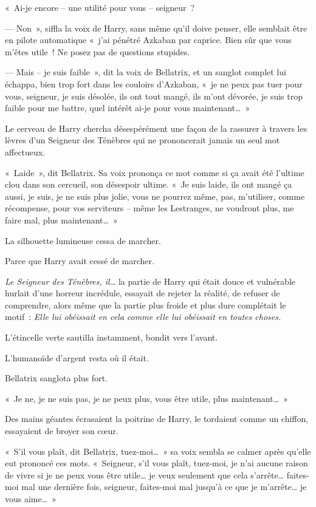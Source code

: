 «~Ai-je encore -- une utilité pour vous -- seigneur~?

--- Non~», siffla la voix de Harry, sans même qu'il doive penser, elle semblait être en pilote automatique «~j'ai pénétré Azkaban par caprice.
Bien sûr que vous m'êtes utile~!
Ne posez pas de questions stupides.

--- Mais -- je suis faible~», dit la voix de Bellatrix, et un sanglot complet lui échappa, bien trop fort dans les couloirs d'Azkaban, «~je ne peux pas tuer pour vous, seigneur, je suis désolée, ils ont tout mangé, ils m'ont dévorée, je suis trop faible pour me battre, quel intérêt ai-je pour vous maintenant…~»

Le cerveau de Harry chercha désespérément une façon de la rassurer à travers les lèvres d'un Seigneur des Ténèbres qui ne prononcerait jamais un seul mot affectueux.

«~Laide~», dit Bellatrix.
Sa voix prononça ce mot comme si ça avait été l'ultime clou dans son cercueil, son désespoir ultime.
«~Je suis laide, ils ont mangé ça aussi, je suis, je ne suis plus jolie, vous ne pourrez même, pas, m'utiliser, comme récompense, pour vos serviteurs -- même les Lestranges, ne voudront plus, me faire mal, plus maintenant…~»

La silhouette lumineuse cessa de marcher.

Parce que Harry avait cessé de marcher.

\emph{Le Seigneur des Ténèbres, il…} la partie de Harry qui était douce et vulnérable hurlait d'une horreur incrédule, essayait de rejeter la réalité, de refuser de comprendre, alors même que la partie plus froide et plus dure complétait le motif~: \emph{Elle lui obéissait en cela comme elle lui obéissait en toutes choses.}

L'étincelle verte sautilla instamment, bondit vers l'avant.

L'humanoïde d'argent resta où il était.

Bellatrix sanglota plus fort.

«~Je ne, je ne suis pas, je ne peux plus, vous être utile, plus maintenant…~»

Des mains géantes écrasaient la poitrine de Harry, le tordaient comme un chiffon, essayaient de broyer son cœur.

«~S'il vous plaît, dit Bellatrix, tuez-moi…~»
sa voix sembla se calmer après qu'elle eut prononcé ces mots.
«~Seigneur, s'il vous plaît, tuez-moi, je n'ai aucune raison de vivre si je ne peux vous être utile… je veux seulement que cela s'arrête… faites-moi mal une dernière fois, seigneur, faites-moi mal jusqu'à ce que je m'arrête… je vous aime…~»

